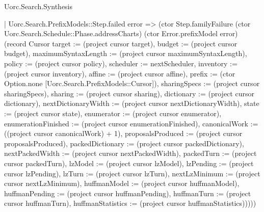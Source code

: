 \begin{lexlean}{Uorc.Search.Synthesis}
\begin{semanticmodule}
{          | Uorc.Search.PrefixModels::Step.failed error => (ctor Step.familyFailure (ctor Uorc.Search.Schedule::Phase.addressCharts) (ctor Error.prefixModel error) (record Cursor {target := (project cursor target), budget := (project cursor budget), maximumSyntaxLength := (project cursor maximumSyntaxLength), policy := (project cursor policy), scheduler := nextScheduler, inventory := (project cursor inventory), affine := (project cursor affine), prefix := (ctor Option.none [Uorc.Search.PrefixModels::Cursor]), sharingSpecs := (project cursor sharingSpecs), sharing := (project cursor sharing), dictionary := (project cursor dictionary), nextDictionaryWidth := (project cursor nextDictionaryWidth), state := (project cursor state), enumerator := (project cursor enumerator), enumerationFinished := (project cursor enumerationFinished), canonicalWork := ((project cursor canonicalWork) + 1), proposalsProduced := (project cursor proposalsProduced), packedDictionary := (project cursor packedDictionary), nextPackedWidth := (project cursor nextPackedWidth), packedTurn := (project cursor packedTurn), lzModel := (project cursor lzModel), lzPending := (project cursor lzPending), lzTurn := (project cursor lzTurn), nextLzMinimum := (project cursor nextLzMinimum), huffmanModel := (project cursor huffmanModel), huffmanPending := (project cursor huffmanPending), huffmanTurn := (project cursor huffmanTurn), huffmanStatistics := (project cursor huffmanStatistics)}))))
}
\end{semanticmodule}
\end{lexlean}
